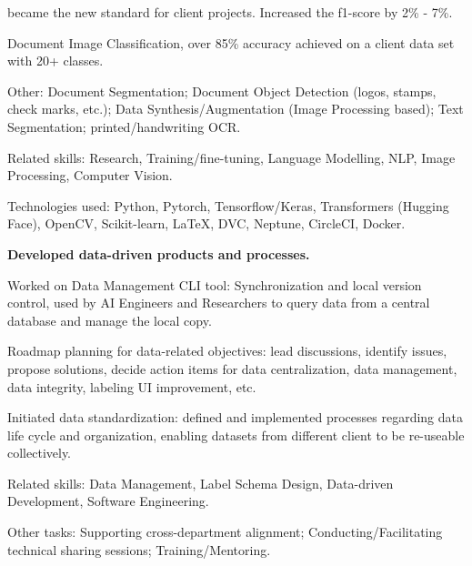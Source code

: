 \begin{xitemize}
\begin{zitemize}
\begin{zitemize}
            became the new standard for client projects. Increased the f1-score by 2\% - 7\%.
        \end{zitemize}
        \item Document Image Classification, over 85\% accuracy achieved on a client data set with 20+ classes.
        \item Other: Document Segmentation; Document Object Detection (logos, stamps, check marks, etc.);
        Data Synthesis/Augmentation (Image Processing based); Text Segmentation;
        printed/handwriting OCR.
        \item Related skills: Research, Training/fine-tuning, Language Modelling, NLP, Image Processing, Computer Vision.
        \item Technologies used: Python, Pytorch, Tensorflow/Keras, Transformers (Hugging Face),
        OpenCV, Scikit-learn, \LaTeX, DVC, Neptune, CircleCI, Docker.
    \end{zitemize}
    \item \textbf{Developed data-driven products and processes.}
    \begin{zitemize}
        \item Worked on Data Management CLI tool: Synchronization and local version control, used by AI Engineers and Researchers to query data from a central database and manage the local copy.
        \item Roadmap planning for data-related objectives: lead discussions, identify issues, propose solutions, decide action items for data centralization, data management, data integrity, labeling UI improvement, etc.
        \item Initiated data standardization: defined and implemented processes regarding data life cycle and organization, enabling datasets from different client to be re-useable collectively.
        \item Related skills: Data Management, Label Schema Design, Data-driven Development, Software Engineering.
    \end{zitemize}
    \item Other tasks: Supporting cross-department alignment; Conducting/Facilitating technical sharing sessions; Training/Mentoring.
\end{xitemize}


